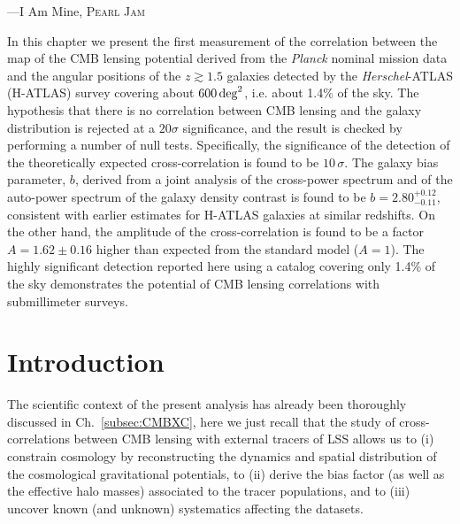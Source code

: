 \setlength{\epigraphwidth}{.65\textwidth}
\begin{epigraphs}
%
 {---I Am Mine, \textsc{Pearl Jam}}
 \end{epigraphs}

In this chapter we present the first measurement of the correlation between the map of the
\gls{CMB} lensing potential derived from the \emph{Planck} nominal mission data and the angular positions of the $z \gtrsim 1.5$ galaxies
detected by the \emph{Herschel}-ATLAS  (H-ATLAS) survey covering about $600\,\hbox{deg}^2$, i.e. about
1.4\% of the sky. The hypothesis that there is no correlation between \gls{CMB} lensing and the galaxy 
distribution is rejected at a $20\sigma$ significance, and the result is checked by performing a number of null tests. Specifically, the significance of the detection of the theoretically expected cross-correlation is found to be $10\,\sigma$. The galaxy bias parameter, $b$, derived from a joint analysis of the cross-power spectrum and of the auto-power spectrum of the galaxy density contrast is found to be $b=2.80^{+0.12}_{-0.11}$, consistent with  earlier estimates for H-ATLAS galaxies at similar redshifts. On the other hand, the amplitude of the  cross-correlation is found to be a factor $A=1.62 \pm 0.16$ higher than expected from the standard model ($A=1$).
The highly significant detection reported here using a catalog covering only 1.4\% of the sky demonstrates the potential of \gls{CMB} lensing correlations with submillimeter surveys.

\section{Introduction}
The scientific context of the present analysis has already been thoroughly discussed in Ch.~\eqref{subsec:CMBXC}, here we just recall that the study of cross-correlations between \gls{CMB} lensing with external tracers of \gls{LSS} allows us to (i) constrain cosmology by reconstructing the dynamics and spatial distribution of the cosmological gravitational potentials, to (ii) derive the bias factor (as well as the effective halo masses) associated to the tracer populations, and to (iii) uncover known (and unknown) systematics affecting the datasets. 

